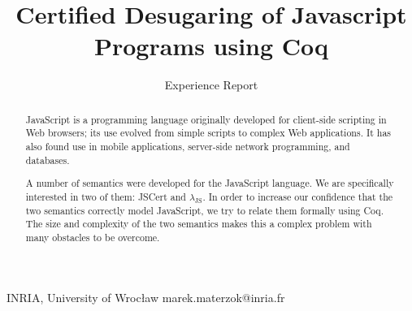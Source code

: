 \documentclass{sigplanconf}
\begin{document}
\setlength{\pdfpageheight}{\paperheight}
\setlength{\pdfpagewidth}{\paperwidth}




\permissiontopublish             %


\title{Certified Desugaring of Javascript Programs using Coq}
\subtitle{Experience Report}

           {INRIA, University of Wroc\l{}aw}
           {marek.materzok@inria.fr}

\maketitle

\newcommand{\lambdajs}{$\lambda_\textrm{JS}$}

\begin{abstract}
JavaScript is a programming language originally developed for client-side
scripting in Web browsers; its use evolved from simple scripts to
complex Web applications. It has also found use in mobile applications,
server-side network programming, and databases.

A number of semantics were developed for the JavaScript language.
We are specifically interested in two of them: JSCert and \lambdajs{}.
In order to increase our confidence that the two semantics correctly
model JavaScript, we try to relate them formally using Coq. The size and complexity
of the two semantics makes this a complex problem with many obstacles
to be overcome.
\end{abstract}

\end{document}
